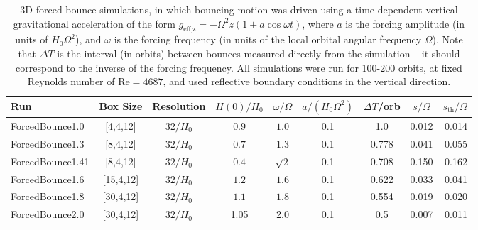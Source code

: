 \documentclass[fleqn,usenatbib]{mnras}
\begin{document}
\begin{table}
\centering
\caption{3D forced bounce simulations, in which bouncing motion was driven using a time-dependent vertical gravitational acceleration of the form $g_{\text{eff,z}} = -\Omega^2 z (1 + a \cos{\omega t})$, where $a$ is the forcing amplitude (in units of $H_0 \Omega^2$), and $\omega$ is the forcing frequency (in units of the local orbital angular frequency $\Omega$). Note that $\Delta T$ is the interval (in orbits) between bounces measured directly from the simulation -- it should correspond to the inverse of the forcing frequency. All simulations were run for 100-200 orbits, at fixed Reynolds number of $\text{Re}=4687$, and used reflective boundary conditions in the vertical direction.}
\label{TABLE_3DSimsFreelyBouncing_ComparisonExplicitNumericalViscosity}
	\begin{tabular}{lcccccccr}
		\hline
		Run	& Box Size & Resolution & $H(0)/H_0$ & $\omega/\Omega$ & $a/(H_0 \Omega^2)$ & $\Delta T$/orb &$s/\Omega$ & $s_{\text{th}}/\Omega$ \\ 
		\hline
		ForcedBounce1.0    & [4,4,12] & $32/H_0$ & $0.9$ & $1.0$ & 0.1 & 1.0 & 0.012 &0.014 \\
        ForcedBounce1.3   & [8,4,12] & $32/H_0$ & $0.7$ & $1.3$ & 0.1 & 0.778 & 0.041 & 0.055 \\
        \hline
		ForcedBounce1.41    & [8,4,12] & $32/H_0$ & $0.4$ & $\sqrt{2}$ & 0.1 & 0.708 & 0.150 &0.162 \\
        \hline
		ForcedBounce1.6   & [15,4,12] & $32/H_0$ & $1.2$ & $1.6$ & 0.1 & 0.622 & 0.033 & 0.041\\
        ForcedBounce1.8   & [30,4,12] & $32/H_0$ & $1.1$ & $1.8$ & 0.1 & 0.554 & 0.019 & 0.020\\
		ForcedBounce2.0  & [30,4,12] & $32/H_0$ & 1.05 & 2.0 & 0.1 & 0.5 & 0.007 & 0.011\\
        \hline
	\end{tabular}
\end{table}

\bsp	%
\label{lastpage}
\end{document}
